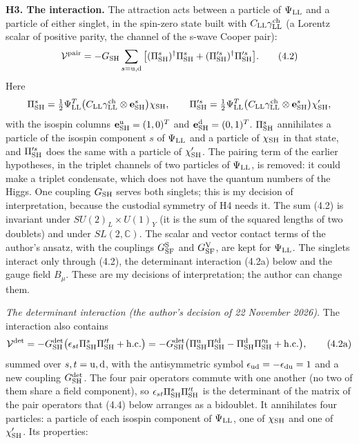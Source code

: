 \documentclass[
  10pt,
]{article}
\begin{document}
\textbf{H3. The interaction.} The attraction acts between a particle of
\(\Psi_{\rm LL}\) and a particle of either singlet, in the spin-zero
state built with \(C_{\rm LL}\gamma^{\rm ch}_{\rm LL}\) (a Lorentz
scalar of positive parity, the channel of the s-wave Cooper pair):
\[\mathcal V^{\rm pair}=-G_{\rm SH}\sum_{s={\rm u},{\rm d}}\big[(\Pi^s_{\rm SH})^\dagger\Pi^s_{\rm SH}+(\Pi'^s_{\rm SH})^\dagger\Pi'^s_{\rm SH}\big].\tag{4.2}\]
Here
\[\Pi^s_{\rm SH}=\tfrac12\Psi^T_{\rm LL}\big(C_{\rm LL}\gamma^{\rm ch}_{\rm LL}\otimes\mathbf e^s_{\rm SH}\big)\chi_{\rm SH},\qquad
\Pi'^s_{\rm SH}=\tfrac12\Psi^T_{\rm LL}\big(C_{\rm LL}\gamma^{\rm ch}_{\rm LL}\otimes\mathbf e^s_{\rm SH}\big)\chi'_{\rm SH},\]
with the isospin columns \(\mathbf e^{\rm u}_{\rm SH}=(1,0)^T\) and
\(\mathbf e^{\rm d}_{\rm SH}=(0,1)^T\). \(\Pi^s_{\rm SH}\) annihilates a
particle of the isospin component \(s\) of \(\Psi_{\rm LL}\) and a
particle of \(\chi_{\rm SH}\) in that state, and \(\Pi'^s_{\rm SH}\)
does the same with a particle of \(\chi'_{\rm SH}\). The pairing term of
the earlier hypotheses, in the triplet channels of two particles of
\(\Psi_{\rm LL}\), is removed: it could make a triplet condensate, which
does not have the quantum numbers of the Higgs. One coupling
\(G_{\rm SH}\) serves both singlets; this is my decision of
interpretation, because the custodial symmetry of H4 needs it. The sum
(4.2) is invariant under \(SU(2)_L\times U(1)_Y\) (it is the sum of the
squared lengths of two doublets) and under \(SL(2,\mathbb C)\). The
scalar and vector contact terms of the author's ansatz, with the
couplings \(G^{\rm S}_{\rm SF}\) and \(G^{\rm V}_{\rm SF}\), are kept
for \(\Psi_{\rm LL}\). The singlets interact only through (4.2), the
determinant interaction (4.2a) below and the gauge field \(B_\mu\).
These are my decisions of interpretation; the author can change them.

\emph{The determinant interaction (the author's decision of 22 November
2026).} The interaction also contains
\[\mathcal V^{\rm det}=-G^{\rm det}_{\rm SH}\big(\epsilon_{st}\Pi^s_{\rm SH}\Pi'^t_{\rm SH}+{\rm h.c.}\big)
=-G^{\rm det}_{\rm SH}\big(\Pi^{\rm u}_{\rm SH}\Pi'^{\rm d}_{\rm SH}-\Pi^{\rm d}_{\rm SH}\Pi'^{\rm u}_{\rm SH}+{\rm h.c.}\big),\tag{4.2a}\]
summed over \(s,t={\rm u},{\rm d}\), with the antisymmetric symbol
\(\epsilon_{\rm ud}=-\epsilon_{\rm du}=1\) and a new coupling
\(G^{\rm det}_{\rm SH}\). The four pair operators commute with one
another (no two of them share a field component), so
\(\epsilon_{st}\Pi^s_{\rm SH}\Pi'^t_{\rm SH}\) is the determinant of the
matrix of the pair operators that (4.4) below arranges as a bidoublet.
It annihilates four particles: a particle of each isospin component of
\(\Psi_{\rm LL}\), one of \(\chi_{\rm SH}\) and one of
\(\chi'_{\rm SH}\). Its properties:
\end{document}
